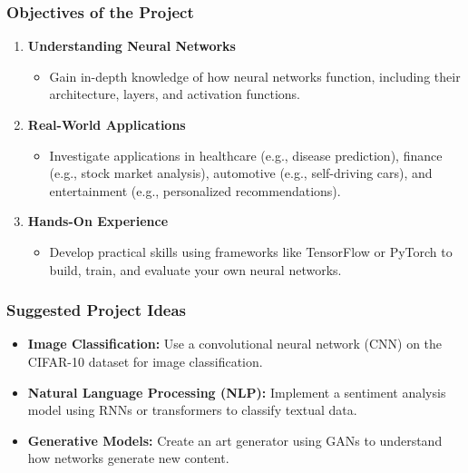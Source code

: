 \documentclass[aspectratio=169]{beamer}
\begin{document}
\begin{frame}[fragile]
    \frametitle{Objectives of the Project}
    \begin{enumerate}
        \item \textbf{Understanding Neural Networks}
            \begin{itemize}
                \item Gain in-depth knowledge of how neural networks function, including their architecture, layers, and activation functions.
            \end{itemize}
        \item \textbf{Real-World Applications}
            \begin{itemize}
                \item Investigate applications in healthcare (e.g., disease prediction), finance (e.g., stock market analysis),
                automotive (e.g., self-driving cars), and entertainment (e.g., personalized recommendations).
            \end{itemize}
        \item \textbf{Hands-On Experience}
            \begin{itemize}
                \item Develop practical skills using frameworks like TensorFlow or PyTorch to build, train, and evaluate your own neural networks.
            \end{itemize}
    \end{enumerate}
\end{frame}

\begin{frame}[fragile]
    \frametitle{Suggested Project Ideas}
    \begin{itemize}
        \item \textbf{Image Classification:} 
            Use a convolutional neural network (CNN) on the CIFAR-10 dataset for image classification.
        \item \textbf{Natural Language Processing (NLP):} 
            Implement a sentiment analysis model using RNNs or transformers to classify textual data.
        \item \textbf{Generative Models:} 
            Create an art generator using GANs to understand how networks generate new content.
    \end{itemize}
\end{frame}
\end{document}
